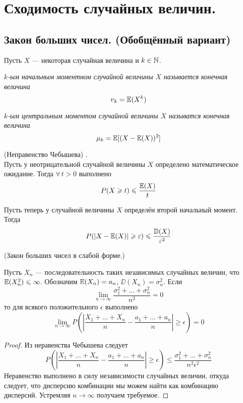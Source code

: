 \section{Сходимость случайных величин.}

\subsection{Закон больших чисел. (Обобщённый вариант)}
Пусть $X$ --- некоторая случайная величина и $k \in \mathbb{N}$.
\begin{definition}
    \it{$k$-ым начальным моментном} случайной величины $X$ называется конечная величина
    \[
        v_k = \mathbb{E}(X^k)
    \]
\end{definition}
\begin{definition}
    \it{$k$-ым центральным моментом} случайной величины $X$ называтся конечная величина
    \[
        \mu_k = \mathbb{E}[(X - \mathbb{E}(X))^2]
    \]
\end{definition}
\begin{proposal}(Неправенство Чебышева)
    .\\

    Пусть у неотрицательной случайной величины $X$ определено математическое ожидание. Тогда $\forall\, t > 0$ выполнено
    \[
        P(X \geqslant t) \leqslant \frac{\mathbb{E}(X)}{t}
    \]

    Пусть теперь у случайной величины $X$ определён второй начальный момент. Тогда
    \[
        P(|X - \mathbb{E}(X)| \geqslant \varepsilon) \leqslant \frac{\mathbb{D}(X)}{\varepsilon^2}
    \]
\end{proposal}
\begin{corollary} (Закон больших чисел в слабой форме.)

    Пусть $X_n$ --- последовательность таких независимых случайных величин, что $\mathbb{E}(X_n^2) \leqslant \infty$. Обозначим
    $\mathbb{E}(X_n) = a_n$, $\DD(X_n) = \sigma_n^2$. Если
    \[
        \lim\limits_{n \to \infty} \frac{\sigma_1^2 + \ldots + \sigma_n^2}{n^2} = 0
    \]
    то для всякого положительного $\epsilon$ выполнено
    \[
        \lim\limits_{n \to \infty} P\left( \left| \frac{X_1 + \ldots + X_n}{n} - \frac{a_1 + \ldots + a_n}{n} \right| \geq \epsilon \right) = 0
    \]
\end{corollary}
\begin{proof}
    Из неравенства Чебышева следует
    \[
        P\left( \left| \frac{X_1 + \ldots + X_n}{n} - \frac{a_1 + \ldots + a_n}{n} \right| \geq \epsilon \right) \leq
        \frac{\sigma_1^2 + \ldots + \sigma_n^2}{n^2\epsilon^2}
    \]
    Неравенство выполнено в силу независимости случайных величин, откуда следует, что дисперсию комбинации мы можем найти
    как комбинацию дисперсий. Устремляя $n \to \infty$ получаем требуемое.
\end{proof}
